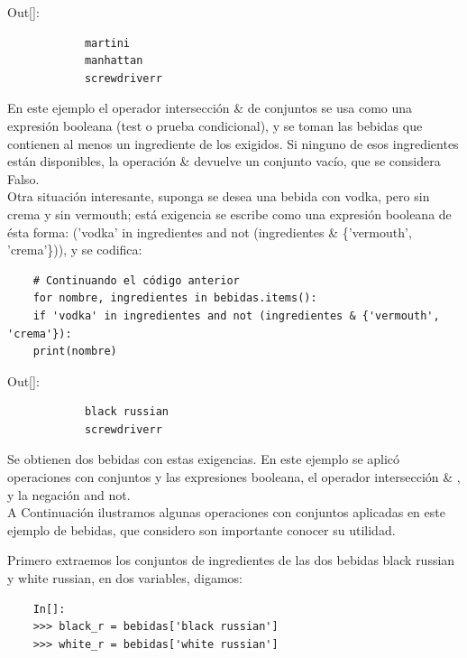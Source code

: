 {\ttfamily\scriptsize\scriptsize \noindent Out[]: \vspace{-0.3cm}	
	{\color{blue} 	
		\begin{verbatim}
			martini
			manhattan
			screwdriverr
		\end{verbatim}
}}

En este ejemplo el operador intersección \& de conjuntos se usa como una expresión booleana (test o prueba condicional), y se toman las bebidas que contienen al menos un ingrediente de los exigidos. Si ninguno de esos ingredientes están disponibles, la operación \& devuelve un conjunto vacío, que se considera Falso.\\


Otra situación interesante, suponga se desea una  bebida con vodka, pero sin crema y sin vermouth; está exigencia se escribe como una expresión booleana de ésta forma:  {\ttfamily  ('vodka' in ingredientes and not (ingredientes \& \{'vermouth', 'crema'\}))},  y se codifica: 

\hspace{-2.5cm}{\ttfamily \scriptsize bebidas.py}  \vspace{-0.5cm}
\begin{lstlisting}
	# Continuando el código anterior
	for nombre, ingredientes in bebidas.items():
	if 'vodka' in ingredientes and not (ingredientes & {'vermouth', 'crema'}):
	print(nombre)
\end{lstlisting}

{\ttfamily\scriptsize\scriptsize \noindent Out[]: \vspace{-0.3cm}	
	{\color{blue} 	
		\begin{verbatim}
			black russian
			screwdriverr
		\end{verbatim}
}}

Se obtienen dos bebidas con estas exigencias. En este ejemplo se aplicó operaciones con conjuntos y las expresiones booleana,  el operador intersección  {\ttfamily \& }, y la negación {\ttfamily and not}.\\



A Continuación ilustramos algunas  operaciones con conjuntos aplicadas en este ejemplo de bebidas,  que considero  
son importante conocer su utilidad. 

Primero extraemos los conjuntos de ingredientes de las dos bebidas  black russian y  white russian,  en dos variables, digamos:

\begin{lstlisting}
	In[]:
	>>> black_r = bebidas['black russian']
	>>> white_r = bebidas['white russian']
\end{lstlisting}



